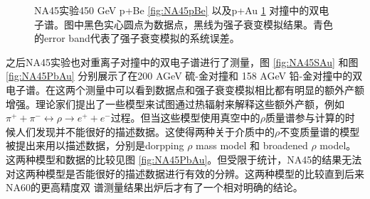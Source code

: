 \begin{figure}[htb]
\begin{subfigure}[b]{0.47\textwidth}
        \caption{}
        \label{fig:NA45pAu}
    \end{subfigure}
    \caption[NA45实验p+Be及p+Au对撞中低质量区间双电子谱]{NA45实验450 GeV p+Be \ref{fig:NA45pBe} 以及p+Au \ref{fig:NA45pAu} 对撞中的双电子谱。图中黑色实心圆点为数据点，黑线为强子衰变模拟结果。青色的error band代表了强子衰变模拟的系统误差。}
       \label{fig:NA45pA}
\end{figure}

之后NA45实验也对重离子对撞中的双电子谱进行了测量，图 \ref{fig:NA45SAu} 和图 \ref{fig:NA45PbAu} 分别展示了在200 AGeV 硫-金对撞和 158 AGeV 铅-金对撞中的双电子谱。在这两个测量中可以看到数据点和强子衰变模拟相比都有明显的额外产额增强。理论家们提出了一些模型来试图通过热辐射来解释这些额外产额，例如$\pi^+ + \pi^- \leftrightarrow \rho \rightarrow e^+ + e^-$过程。但当这些模型使用真空中的$\rho$质量谱参与计算的时候人们发现并不能很好的描述数据。这使得两种关于介质中的$\rho$不变质量谱的模型被提出来用以描述数据，分别是dorpping $\rho$ mass model 和 broadened $\rho$ model。这两种模型和数据的比较见图 \ref{fig:NA45PbAu}。但受限于统计，NA45的结果无法对这两种模型是否能很好的描述数据进行有效的分辨。这两种模型的比较直到后来NA60的更高精度双 \muon 谱测量结果出炉后才有了一个相对明确的结论。

